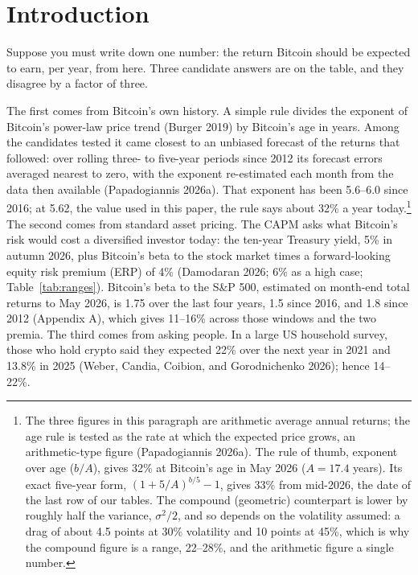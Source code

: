 \documentclass[11pt]{article}
\begin{document}
\clearpage
{}


\section{Introduction}

Suppose you must write down one number: the return Bitcoin should be expected to earn, per year, from here. Three candidate answers are on the table, and they disagree by a factor of three.

The first comes from Bitcoin's own history. A simple rule divides the exponent of Bitcoin's power-law price trend (Burger 2019) by Bitcoin's age in years. Among the candidates tested it came closest to an unbiased forecast of the returns that followed: over rolling three- to five-year periods since 2012 its forecast errors averaged nearest to zero, with the exponent re-estimated each month from the data then available (Papadogiannis 2026a). That exponent has been 5.6--6.0 since 2016; at 5.62, the value used in this paper, the rule says about 32\% a year today.\footnote{The three figures in this paragraph are arithmetic average annual returns; the age rule is tested as the rate at which the expected price grows, an arithmetic-type figure (Papadogiannis 2026a). The rule of thumb, exponent over age ($b/A$), gives 32\% at Bitcoin's age in May 2026 ($A = 17.4$ years). Its exact five-year form, $(1+5/A)^{b/5}-1$, gives 33\% from mid-2026, the date of the last row of our tables. The compound (geometric) counterpart is lower by roughly half the variance, $\sigma^2/2$, and so depends on the volatility assumed: a drag of about 4.5 points at 30\% volatility and 10 points at 45\%, which is why the compound figure is a range, 22--28\%, and the arithmetic figure a single number.} The second comes from standard asset pricing. The CAPM asks what Bitcoin's risk would cost a diversified investor today: the ten-year Treasury yield, 5\% in autumn 2026, plus Bitcoin's beta to the stock market times a forward-looking equity risk premium (ERP) of 4\% (Damodaran 2026; 6\% as a high case; Table~\ref{tab:ranges}). Bitcoin's beta to the S\&P 500, estimated on month-end total returns to May 2026, is 1.75 over the last four years, 1.5 since 2016, and 1.8 since 2012 (Appendix A), which gives 11--16\% across those windows and the two premia. The third comes from asking people. In a large US household survey, those who hold crypto said they expected 22\% over the next year in 2021 and 13.8\% in 2025 (Weber, Candia, Coibion, and Gorodnichenko 2026); hence 14--22\%.
\end{document}
